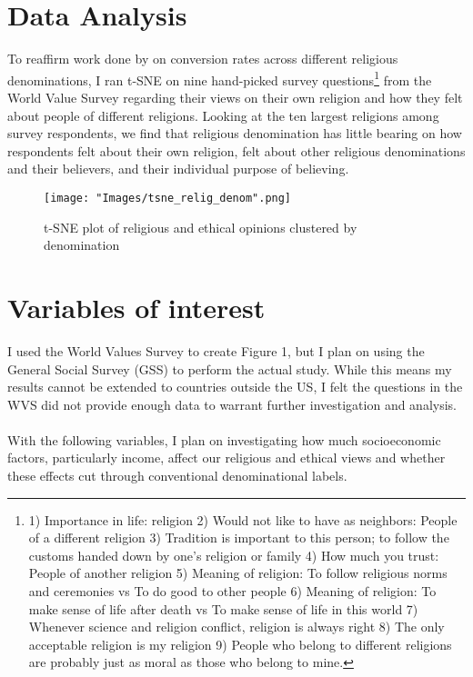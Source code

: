 \documentclass{article}
\begin{document}
	\section{Data Analysis}
	To reaffirm work done by \cite{relig_convert} on conversion rates across different religious denominations, I ran t-SNE on nine hand-picked survey questions\footnote{1) Importance in life: religion 2) Would not like to have as neighbors: People of a different religion 3) Tradition is important to this person; to follow the customs handed down by one’s religion or family 4) How much you trust: People of another religion 5) Meaning of religion: To follow religious norms and ceremonies vs To do good to other people 6) Meaning of religion: To make sense of life after death vs To make sense of life in this world 7) Whenever science and religion conflict, religion is always right 8) The only acceptable religion is my religion 9) People who belong to different religions are probably just as moral as those who belong to mine.} from the World Value Survey regarding their views on their own religion and how they felt about people of different religions. Looking at the ten largest religions among survey respondents, we find that religious denomination has little bearing on how respondents felt about their own religion, felt about other religious denominations and their believers, and their individual purpose of believing.
	
	\begin{figure}[t]
		\centering
		\texttt{[image: "Images/tsne\_relig\_denom".png]}
		\caption{t-SNE plot of religious and ethical opinions clustered by denomination}
	\end{figure}

	\section{Variables of interest}
	I used the World Values Survey to create Figure 1, but I plan on using the General Social Survey (GSS) to perform the actual study. While this means my results cannot be extended to countries outside the US, I felt the questions in the WVS did not provide enough data to warrant further investigation and analysis.
	\\
	\\
	With the following variables, I plan on investigating how much socioeconomic factors, particularly income, affect our religious and ethical views and whether these effects cut through conventional denominational labels.
	
\end{document}
